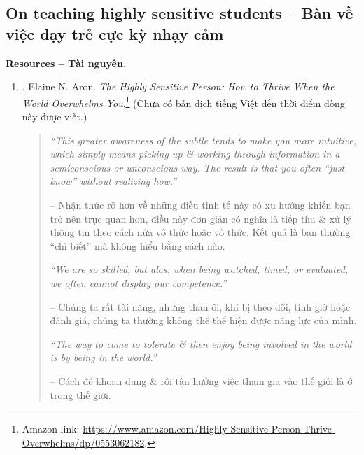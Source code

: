 \documentclass[12pt]{article}
\begin{document}
\subsection{On teaching highly sensitive students -- Bàn về việc dạy trẻ cực kỳ nhạy cảm}
\textbf{\textsf{Resources -- Tài nguyên.}}
\begin{enumerate}
	\item \cite{Aron_HSP}. {\sc Elaine N. Aron}. {\it The Highly Sensitive Person: How to Thrive When the World Overwhelms You}.\footnote{Amazon link: \url{https://www.amazon.com/Highly-Sensitive-Person-Thrive-Overwhelms/dp/0553062182}.} (Chưa có bản dịch tiếng Việt đến thời điểm dòng này được viết.)
	\begin{quotation}
		{\it``This greater awareness of the subtle tends to make you more intuitive, which simply means picking up \& working through information in a semiconscious or unconscious way. The result is that you often ``just know'' without realizing how.''}
		
		-- Nhận thức rõ hơn về những điều tinh tế này có xu hướng khiến bạn trở nên trực quan hơn, điều này đơn giản có nghĩa là tiếp thu \& xử lý thông tin theo cách nửa vô thức hoặc vô thức. Kết quả là bạn thường ``chỉ biết'' mà không hiểu bằng cách nào.		
		
		{\it``We are so skilled, but alas, when being watched, timed, or evaluated, we often cannot display our competence.''}
		
		-- Chúng ta rất tài năng, nhưng than ôi, khi bị theo dõi, tính giờ hoặc đánh giá, chúng ta thường không thể thể hiện được năng lực của mình.
		
		{\it``The way to come to tolerate \& then enjoy being involved in the world is by being in the world.''}
		
		-- Cách để khoan dung \& rồi tận hưởng việc tham gia vào thế giới là ở trong thế giới.
	\end{quotation}
\end{enumerate}

\end{document}
